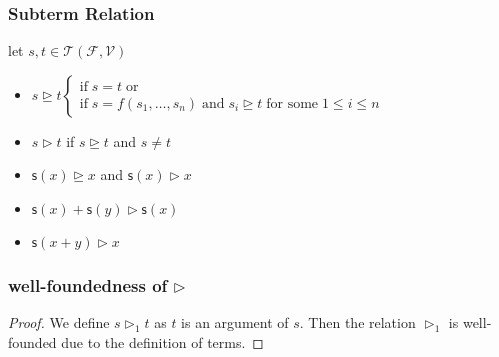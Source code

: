 \documentclass[12pt,aspectratio=169]{beamer}
\newcommand{\m}[1]{\mathsf{#1}}
\newcommand{\FF}{\mathcal{F}}
\newcommand{\VV}{\mathcal{V}}
\newcommand{\TT}{\mathcal{T}}
\begin{document}
\begin{frame}
    \frametitle{Subterm Relation}
    \begin{definition}
        let $s,t \in \TT(\FF,\VV)$
        \begin{itemize}
            \item $s \unrhd t \begin{cases}
                \text{if}\; s = t\; \text{or}\\
                \text{if}\; s = f(s_1,\dots,s_n)\; \text{and} \; s_i \unrhd t \; \text{for some} \; 1 \leq i \leq n
            \end{cases}$
            \item $s \rhd t$ if $s \unrhd t$ and $s \neq t$
        \end{itemize}
    \end{definition}

    \begin{example}
        \begin{itemize}
            \item $\m{s}(x) \unrhd x$ and $\m{s}(x) \rhd x$
            \item $\m{s}(x) + \m{s}(y) \rhd \m{s}(x)$
            \item $\m{s}(x + y) \rhd x$
        \end{itemize}
    \end{example}
\end{frame}

\begin{frame}
    \frametitle{well-foundedness of $\rhd$}
    \begin{comment}
    \begin{definition}
        $s \rhd_1 t$ if $s = f(s_1,\dots,s_n)$ and $s_i = t$ for some $1 \leq i \leq n$
    \end{definition}
    \begin{lemma}
        $\rhd_1$ is well-founded
    \end{lemma}
    \begin{proof}
        Suppose $s_1 \rhd_1 s_2 \rhd_1 s_3 \rhd_1 \cdots$.
        Then we have $f_1(\dots,f_2(\dots, f_3(\dots)\dots),\dots)$. By the definition of terms,
        we 
    \end{proof}
    \end{comment}

    \begin{lemma}
    \end{lemma}
    \begin{proof}
        We define $s \rhd_1 t$ as $t$ is an argument of $s$.
        Then the relation $\rhd_1$ is well-founded due to the definition of terms.
        
    \end{proof}
\end{frame}
\end{document}
